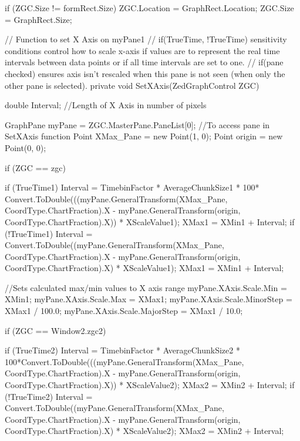 {{{{                if (ZGC.Size != formRect.Size)
                {
                    ZGC.Location = GraphRect.Location;
                    ZGC.Size = GraphRect.Size;
                }
            }
        }

        // Function to set X Axis on myPane1
        // if(TrueTime, !TrueTime) sensitivity conditions control how to scale x-axis if values are to represent  the real time intervals between data points or if all time intervals are set to one.
        // if(pane checked) ensures axis isn't rescaled when this pane is not seen (when only the other pane is selected).
        private void SetXAxis(ZedGraphControl ZGC)
        {
            double Interval; //Length of X Axis in number of pixels

            GraphPane myPane = ZGC.MasterPane.PaneList[0]; //To access pane in SetXAxis function
            Point XMax_Pane = new Point(1, 0);
            Point origin = new Point(0, 0);

            if (ZGC == zgc)
            {
                if (TrueTime1)
                {
                    Interval = TimebinFactor * AverageChunkSize1 * 100* Convert.ToDouble(((myPane.GeneralTransform(XMax_Pane, CoordType.ChartFraction).X - myPane.GeneralTransform(origin, CoordType.ChartFraction).X)) * XScaleValue1);
                    XMax1 = XMin1 + Interval;
                }
                if (!TrueTime1)
                {
                    Interval = Convert.ToDouble((myPane.GeneralTransform(XMax_Pane, CoordType.ChartFraction).X - myPane.GeneralTransform(origin, CoordType.ChartFraction).X) * XScaleValue1);
                    XMax1 = XMin1 + Interval;
                }

                //Sets calculated max/min values to X axis range
                myPane.XAxis.Scale.Min = XMin1; 
                myPane.XAxis.Scale.Max = XMax1;
                myPane.XAxis.Scale.MinorStep = XMax1 / 100.0;
                myPane.XAxis.Scale.MajorStep = XMax1 / 10.0;
            }

            if (ZGC == Window2.zgc2)
            {
                if (TrueTime2)
                {
                    Interval = TimebinFactor * AverageChunkSize2 * 100*Convert.ToDouble(((myPane.GeneralTransform(XMax_Pane, CoordType.ChartFraction).X - myPane.GeneralTransform(origin, CoordType.ChartFraction).X)) * XScaleValue2);
                    XMax2 = XMin2 + Interval;
                }
                if (!TrueTime2)
                {
                    Interval = Convert.ToDouble((myPane.GeneralTransform(XMax_Pane, CoordType.ChartFraction).X - myPane.GeneralTransform(origin, CoordType.ChartFraction).X) * XScaleValue2);
                    XMax2 = XMin2 + Interval;
                }

}}}}
